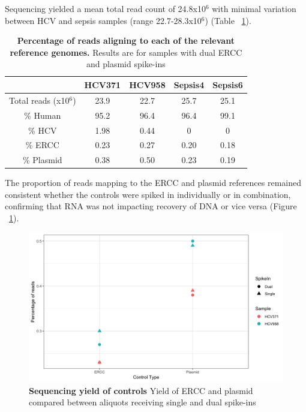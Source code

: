 Sequencing yielded a mean total read count of 24.8x10$^6$ with minimal variation between HCV and sepsis samples (range 22.7-28.3x10$^6$) (Table ~\ref{tab:OptSummary}).

\begin{table}[]
\begin{tabular}{|c|c|c|c|c|}
\hline
                      & HCV371 & HCV958 & Sepsis4 & Sepsis6 \\ \hline
Total reads (x10$^6$) & 23.9   & 22.7   & 25.7    & 25.1    \\ \hline
\% Human              & 95.2   & 96.4   & 96.4    & 99.1    \\ \hline
\% HCV                & 1.98   & 0.44   & 0       & 0       \\ \hline
\% ERCC               & 0.23   & 0.27   & 0.20    & 0.18    \\ \hline
\% Plasmid            & 0.38   & 0.50   & 0.23    & 0.19    \\ \hline
\end{tabular}
\caption[Combined no fragmentation evaluation: summary]{\textbf{Percentage of reads aligning to each of the relevant reference genomes.} Results are for samples with dual ERCC and plasmid spike-ins}
\label{tab:OptSummary}
\end{table}

The proportion of reads mapping to the ERCC and plasmid references remained consistent whether the controls were spiked in individually or in combination, confirming that RNA was not impacting recovery of DNA or vice versa (Figure ~\ref{fig:spikein}). 

\begin{figure}[htbp]
\centering
\includegraphics[width=12cm]{./Results1/Images/spike-ins-1.png}
\caption[Sequencing of spike-in controls]{\textbf{Sequencing yield of controls} Yield of ERCC and plasmid compared between aliquots receiving single and dual spike-ins}
\label{fig:spikein}
\end{figure}

